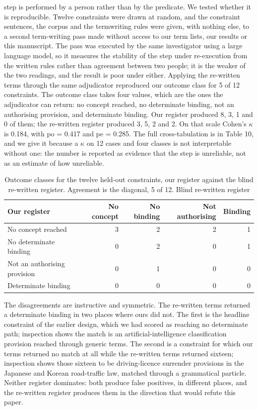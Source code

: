 step is performed by a person rather than by the predicate. We tested whether it is reproducible. Twelve constraints were drawn at random, and the constraint sentences, the corpus and the termwriting rules were given, with nothing else, to a second term-writing pass made without access to our term lists, our results or this manuscript. The pass was executed by the same investigator using a large language model, so it measures the stability of the step under re-execution from the written rules rather than agreement between two people; it is the weaker of the two readings, and the result is poor under either. Applying the re-written terms through the same adjudicator reproduced our outcome class for 5 of 12 constraints. The outcome class takes four values, which are the ones the adjudicator can return: no concept reached, no determinate binding, not an authorising provision, and determinate binding. Our register produced 8, 3, 1 and 0 of them; the re-written register produced 3, 5, 2 and 2. On that scale Cohen's $\kappa$ is 0.184, with po = 0.417 and pe = 0.285. The full cross-tabulation is in Table 10, and we give it because a $\kappa$ on 12 cases and four classes is not interpretable without one: the number is reported as evidence that the step is unreliable, not as an estimate of how unreliable.

\begin{table}[!htb]
\centering
\caption{Outcome classes for the twelve held-out constraints, our register against the blind re-written register. Agreement is the diagonal, 5 of 12. Blind re-written register}
\label{tab:t10}
\small
\begin{tabular}{@{}lrrrr@{}}
\toprule
Our register & No concept & No binding & Not authorising & Binding \\
\midrule
No concept reached & 3 & 2 & 2 & 1 \\
No determinate binding & 0 & 2 & 0 & 1 \\
Not an authorising provision & 0 & 1 & 0 & 0 \\
Determinate binding & 0 & 0 & 0 & 0 \\
\bottomrule
\end{tabular}
\end{table}

The disagreements are instructive and symmetric. The re-written terms returned a determinate binding in two places where ours did not. The first is the headline constraint of the earlier design, which we had scored as reaching no determinate path; inspection shows the match is an artificial-intelligence classification provision reached through generic terms. The second is a constraint for which our terms returned no match at all while the re-written terms returned sixteen; inspection shows those sixteen to be driving-licence surrender provisions in the Japanese and Korean road-traffic law, matched through a grammatical particle. Neither register dominates: both produce false positives, in different places, and the re-written register produces them in the direction that would refute this paper.

